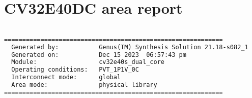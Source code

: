 \section{CV32E40DC area report}
\label{app:dc_area}

\begin{lstlisting}[caption={Area report from synthesis of the CV32E40DC.}, label=lst:cv32e40dc_area, language=txt]

============================================================
  Generated by:           Genus(TM) Synthesis Solution 21.18-s082_1
  Generated on:           Dec 15 2023  06:57:43 pm
  Module:                 cv32e40s_dual_core
  Operating conditions:   PVT_1P1V_0C 
  Interconnect mode:      global
  Area mode:              physical library
============================================================


\end{lstlisting}
